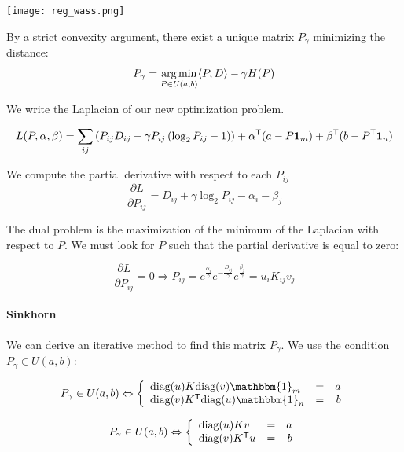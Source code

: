 \begin{center}
	\texttt{[image: reg\_wass.png]}
\end{center}

By a strict convexity argument, there exist a unique matrix $P_\gamma$
minimizing the distance:
$$ P_\gamma = \operatorname*{arg\,min}_{P \in U(a, b)} \langle P, D \rangle - \gamma H(P) $$


\dem

We write the Laplacian of our new optimization problem.

$$ L(P, \alpha, \beta) = \sum_{ij} \left( P_{ij} D_{ij} + \gamma P_{ij} \left( \log_2 P_{ij} - 1 \right) \right) + \alpha^{\mathsf{T}} (a - P \mathbf{1}_m) + \beta^{\mathsf{T}} (b - P^{\mathsf{T}} \mathbf{1}_n) $$

We compute the partial derivative with respect to each $P_{ij}$
$$ \dfrac{\partial L}{\partial P_{ij}} = D_{ij} + \gamma \log_2 P_{ij} - \alpha_i - \beta_j $$

The dual problem is the maximization of the minimum of the Laplacian with
respect to $P$. We must look for $P$ such that the partial derivative is
equal to zero:

$$ \dfrac{\partial L}{\partial P_{ij}} = 0 \Rightarrow P_{ij} = e^{\frac{\alpha_i}{\gamma}} e^{-\frac{D_{ij}}{\gamma}}  e^{\frac{\beta_j}{\gamma}} = u_i K_{ij} v_j $$

\findem

\paragraph{Sinkhorn}
We can derive an iterative method to find this matrix $P_\gamma$. We use
the condition $P_\gamma \in U(a,b)$:

$$ P_\gamma \in U(a, b) \Leftrightarrow \left\{ \begin{array}{lrr}
\text{diag}(u) K \text{diag}(v) \mathbbm{1}_m & = & a \\
\text{diag}(v) K^\trans \text{diag}(u) \mathbbm{1}_n & = & b
\end{array} \right. $$

$$ P_\gamma \in U(a, b) \Leftrightarrow \left\{ \begin{array}{lrr}
\text{diag}(u) K v & = & a \\
\text{diag}(v) K^{\mathsf{T}} u & = & b
\end{array} \right. $$

